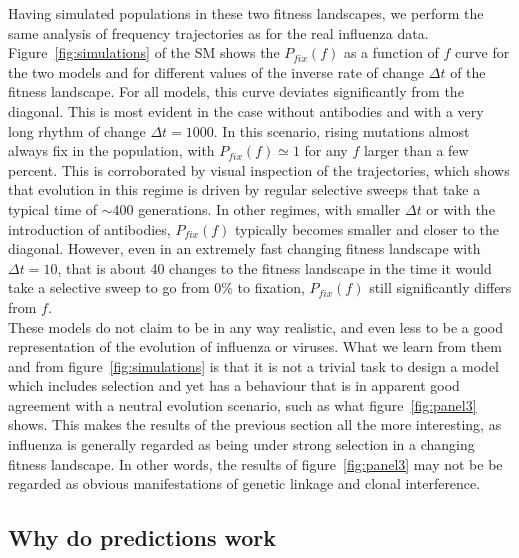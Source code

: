 \documentclass{article}
\begin{document}
	Having simulated populations in these two fitness landscapes, we perform the same analysis of frequency trajectories as for the real influenza data. Figure~\ref{fig:simulations} of the SM shows the $P_{fix}(f)$ as a function of $f$ curve for the two models and for different values of the inverse rate of change $\Delta t$ of the fitness landscape. For all models, this curve deviates significantly from the diagonal. This is most evident in the case without antibodies and with a very long rhythm of change $\Delta t=1000$. In this scenario, rising mutations almost always fix in the population, with $P_{fix}(f)\simeq 1$ for any $f$ larger than a few percent. This is corroborated by visual inspection of the trajectories, which shows that evolution in this regime is driven by regular selective sweeps that take a typical time of $\sim 400$ generations. In other regimes, with smaller $\Delta t$ or with the introduction of antibodies, $P_{fix}(f)$ typically becomes smaller and closer to the diagonal. However, even in an extremely fast changing fitness landscape with $\Delta t=10$, that is about 40 changes to the fitness landscape in the time it would take a selective sweep to go from 0\% to fixation, $P_{fix}(f)$ still significantly differs from $f$. \\
	These models do not claim to be in any way realistic, and even less to be a good representation of the evolution of influenza or viruses. What we learn from them and from figure~\ref{fig:simulations} is that it is not a trivial task to design a model which includes selection and yet has a behaviour that is in apparent good agreement with a neutral evolution scenario, such as what figure~\ref{fig:panel3} shows. This makes the results of the previous section all the more interesting, as influenza is generally regarded as being under strong selection in a changing fitness landscape. In other words, the results of figure~\ref{fig:panel3} may not be be regarded as obvious manifestations of genetic linkage and clonal interference. 

	\subsection*{Why do predictions work}
\end{document}
